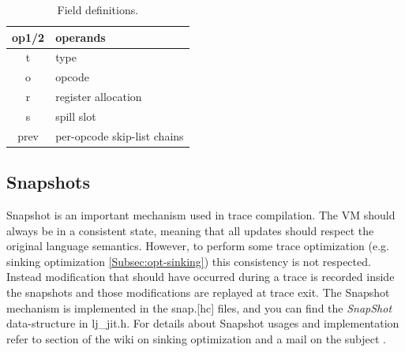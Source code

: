 \begin{table}[H]
\centering
\caption{Field definitions.}
\label{tab:ir-field}
\begin{tabular}{|c|l|}
\hline
op1/2 & operands                    \\ \hline
t     & type                        \\ \hline
o     & opcode                      \\ \hline
r     & register allocation         \\ \hline
s     & spill slot                  \\ \hline
prev  & per-opcode skip-list chains \\ \hline
\end{tabular}
\end{table}


\subsection{Snapshots}
\label{Subsec:snap}

Snapshot is an important mechanism used in trace compilation. The VM should
always be in a consistent state, meaning that all updates should respect the
original language semantics. However, to perform some trace optimization
(e.g. sinking optimization \ref{Subsec:opt-sinking}) this consistency is not respected. Instead
modification that should have occurred during a trace is recorded inside the
snapshots and those modifications are replayed at trace exit. The Snapshot
mechanism is implemented in the snap.[hc] files, and you can find the
\emph{SnapShot} data-structure in lj\_jit.h. For details about
Snapshot usages and implementation refer to section of the wiki on sinking
optimization \cite{luajit-sink} and a mail on the subject \cite{luajit-mail-1}.
